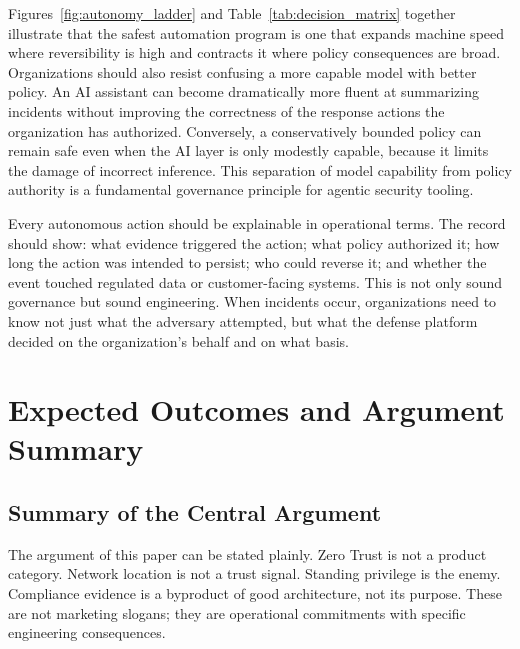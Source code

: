 \documentclass[unnumsec,webpdf,contemporary,large]{oup-authoring-template}
\theoremstyle{thmstyleone}
\theoremstyle{thmstyletwo}
\theoremstyle{thmstylethree}
\begin{document}
Figures~\ref{fig:autonomy_ladder} and Table~\ref{tab:decision_matrix} together illustrate
that the safest automation program is one that expands machine speed where reversibility
is high and contracts it where policy consequences are broad. Organizations should also
resist confusing a more capable model with better policy. An AI assistant can become
dramatically more fluent at summarizing incidents without improving the correctness of
the response actions the organization has authorized. Conversely, a conservatively
bounded policy can remain safe even when the AI layer is only modestly capable, because
it limits the damage of incorrect inference. This separation of model capability from
policy authority is a fundamental governance principle for agentic security tooling.

Every autonomous action should be explainable in operational terms. The record should
show: what evidence triggered the action; what policy authorized it; how long the action
was intended to persist; who could reverse it; and whether the event touched regulated
data or customer-facing systems. This is not only sound governance but sound engineering.
When incidents occur, organizations need to know not just what the adversary attempted,
but what the defense platform decided on the organization's behalf and on what basis.

\section{Expected Outcomes and Argument Summary}

\subsection{Summary of the Central Argument}

The argument of this paper can be stated plainly. Zero Trust is not a product category.
Network location is not a trust signal. Standing privilege is the enemy. Compliance
evidence is a byproduct of good architecture, not its purpose. These are not marketing
slogans; they are operational commitments with specific engineering consequences.
\end{document}
